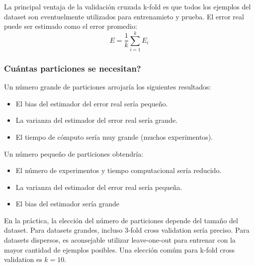 \documentclass{article}
\begin{document}
La principal ventaja de la validación cruzada k-fold es que todos los ejemplos del dataset son eventuelmente utilizados para entrenamieto y prueba.
El error real puede ser estimado como el error promedio:
$$
	E = \frac{1}{k} \sum_{i=1}^k E_{i}
$$

\subsubsection*{Cuántas particiones se necesitan?}
Un número grande de particiones arrojaría los siguientes resultados:
\begin{itemize}
	\item \checkmark El bias del estimador del error real sería pequeño.
	\item \texttimes La varianza del estimador del error real sería grande.
	\item \texttimes El tiempo de cómputo sería muy grande (muchos experimentos).
\end{itemize}

Un número pequeño de particiones obtendría:
\begin{itemize}
	\item \checkmark El número de experimentos y tiempo computacional sería reducido.
	\item \checkmark La varianza del estimador del error real sería pequeña.
	\item \texttimes El bias del estimador sería grande
\end{itemize}

En la práctica, la elección del número de particiones depende del tamaño del dataset.
Para datasets grandes, incluso 3-fold cross validation sería preciso.
Para datasets dispersos, es aconsejable utilizar leave-one-out para entrenar con la mayor cantidad de ejemplos posibles. Una elección comúm para k-fold cross validation es $k=10$.

\end{document}
